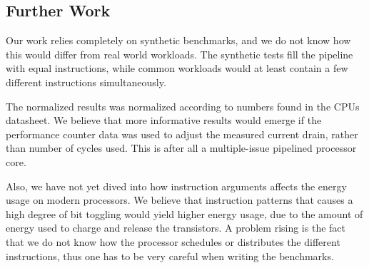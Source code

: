 %
%



\subsection{Further Work}
Our work relies completely on synthetic benchmarks, and we do not know how this
would differ from real world workloads. The synthetic tests fill the pipeline
with equal instructions, while common workloads would at least contain a few
different instructions simultaneously.

The normalized results was normalized according to numbers found in the CPUs
datasheet.  We believe that more informative results would emerge if the
performance counter data was used to adjust the measured current drain, rather
than number of cycles used. This is after all a multiple-issue pipelined
processor core.

Also, we have not yet dived into how instruction arguments affects the energy
usage on modern processors. We believe that instruction patterns that causes a
high degree of bit toggling would yield higher energy usage, due to the amount
of energy used to charge and release the transistors. A problem rising is the
fact that we do not know how the processor schedules or distributes the
different instructions, thus one has to be very careful when writing the
benchmarks.


